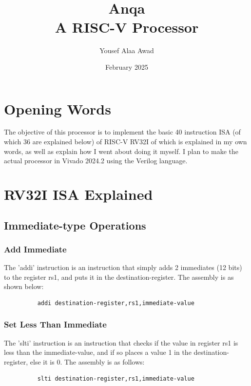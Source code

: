 \documentclass{article}
\title{Anqa \\ \small A RISC-V Processor}
\author{Yousef Alaa Awad}
\date{February 2025}
\begin{document}
\maketitle

\section{Opening Words}
\qquad
The objective of this processor is to implement the basic 40 instruction ISA (of which 36 are explained below) of RISC-V RV32I of which is explained in my own words, as well as explain how I went about doing it myself. I plan to make the actual processor in Vivado 2024.2 using the Verilog language.
\newpage



\tableofcontents
\newpage



\section{RV32I ISA Explained}
\subsection{Immediate-type Operations}

\subsubsection{Add Immediate}
\qquad
The 'addi' instruction is an instruction that simply adds 2 immediates (12 bits) to the register rs1, and puts it in the destination-register. The assembly is as shown below:
\begin{figure}[!htbp]
    \centering
    \begin{verbatim}
    addi destination-register,rs1,immediate-value
    \end{verbatim}
\end{figure}\newline

\subsubsection{Set Less Than Immediate}
\qquad
The 'slti' instruction is an instruction that checks if the value in register rs1 is less than the immediate-value, and if so places a value 1 in the destination-register, else it is 0. The assembly is as follows:
\begin{figure}[!htbp]
    \centering
    \begin{verbatim}
    slti destination-register,rs1,immediate-value
    \end{verbatim}
\end{figure}\newline
\end{document}
